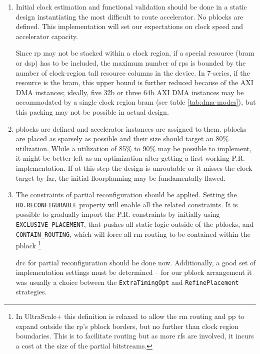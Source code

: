 \begin{enumerate}
\item	Initial clock estimation and functional validation should be done
	in a static design instantiating the most difficult to route accelerator.
	No \glspl{pblock} are defined.
	This implementation will set our expectations on clock speed and
	accelerator capacity. 
	
	Since \gls{rp} may not be stacked within a clock region,
	if a special resource (\gls{bram} or \gls{dsp}) has to be included,
	the maximum number of \glspl{rp} is bounded
	by the number of clock-region tall resource columns in the device.
	In 7-series, if the resource is the \gls{bram}, this upper bound is
	further reduced because of the AXI DMA instances; 
	ideally, five 32b or three 64b AXI DMA instances may be accommodated by
	a single clock region \gls{bram} (see table \ref{tab:dma-modes}), 
	but this packing may not be possible in actual design.

\item	\Glspl{pblock} are defined and accelerator instances are assigned
	to them. \Glspl{pblock} are placed as sparsely as possible
	and their size should target an 80\% utilization.
	While a utilization of 85\% to 90\% may be possible to implement,
	it might be better left as an optimization after getting
	a first working P.R. implementation. If at this step the
	design is unroutable or it misses the clock target by far,
	the initial floorplanning may be fundamentally flawed.

\item	The constraints of partial reconfiguration should be applied.
	Setting the \texttt{HD.RECONFIGURABLE} property will enable
	all the related constraints. 
	It is possible to gradually import the P.R. constraints by
	initially using \texttt{EXCLUSIVE\_PLACEMENT}, that pushes all
	static logic outside of the \glspl{pblock}, and \texttt{CONTAIN\_ROUTING},
	which will force all \gls{rm} routing to be contained within the \gls{pblock}
	\footnote{In UltraScale+ this definition is relaxed to allow the \gls{rm} routing
	and \gls{pp} to expand outside the \gls{rp}'s \gls{pblock} borders, but no further
	than clock region boundaries. This is to facilitate routing but as more \glspl{rf}
	are involved, it incurs a cost at the size of the partial bitstreams.}

	\gls{drc} for partial reconfiguration should be done now. 
	Additionally, a good set of implementation settings
	must be determined -- for our \gls{pblock} arrangement it was
	usually a choice between the \texttt{ExtraTimingOpt}
	and \texttt{RefinePlacement} strategies.


\end{enumerate}
